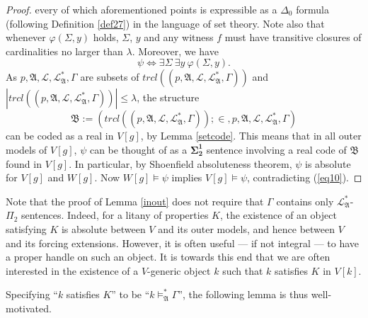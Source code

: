 \documentclass[12pt, twoside]{memoir}
\numberwithin{equation}{section}
\theoremstyle{definition}
\theoremstyle{remark}
\theoremstyle{definition}
\theoremstyle{definition}
\theoremstyle{definition}
\theoremstyle{remark}
\begin{document}
\begin{proof}
every of which aforementioned points is expressible as a $\Delta_0$ formula (following Definition \ref{def27}) in the language of set theory. Note also that whenever $\varphi(\Sigma, y)$ holds, $\Sigma$, $y$ and any witness $f$ must have transitive closures of cardinalities no larger than $\lambda$. Moreover, we have $$\psi \iff \exists \Sigma \ \exists y \ \varphi(\Sigma, y).$$ As $p, \mathfrak{A}, \mathcal{L}, \mathcal{L}^*_{\mathfrak{A}}, \Gamma$ are subsets of $trcl((p, \mathfrak{A}, \mathcal{L}, \mathcal{L}^*_{\mathfrak{A}}, \Gamma))$ and $|trcl((p, \mathfrak{A}, \mathcal{L}, \mathcal{L}^*_{\mathfrak{A}}, \Gamma))| \leq \lambda$, the structure $$\mathfrak{B} := (trcl((p, \mathfrak{A}, \mathcal{L}, \mathcal{L}^*_{\mathfrak{A}}, \Gamma)); \in, p, \mathfrak{A}, \mathcal{L}, \mathcal{L}^*_{\mathfrak{A}}, \Gamma)$$ can be coded as a real in $V[g]$, by Lemma \ref{setcode}. This means that in all outer models of $V[g]$, $\psi$ can be thought of as a $\mathbf{\Sigma^1_2}$ sentence involving a real code of $\mathfrak{B}$ found in $V[g]$. In particular, by Shoenfield absoluteness theorem, $\psi$ is absolute for $V[g]$ and $W[g]$. Now $W[g] \models \psi$ implies $V[g] \models \psi$, contradicting (\ref{eq10}).
\end{proof}

Note that the proof of Lemma \ref{inout} does not require that $\Gamma$ contains only $\mathcal{L}^*_{\mathfrak{A}}$-$\Pi_2$ sentences. Indeed, for a litany of properties $K$, the existence of an object satisfying $K$ is absolute between $V$ and its outer models, and hence between $V$ and its forcing extensions. However, it is often useful --- if not integral --- to have a proper handle on such an object. It is towards this end that we are often interested in the existence of a $V$-generic object $k$ such that $k$ satisfies $K$ in $V[k]$.

Specifying ``$k$ satisfies $K$'' to be ``$k \models^{*}_{\mathfrak{A}} \Gamma$'', the following lemma is thus well-motivated. 
\end{document}
